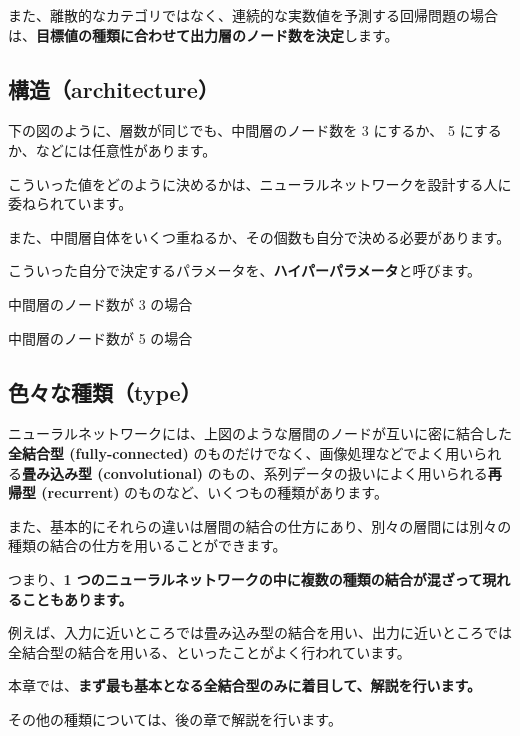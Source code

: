 また、離散的なカテゴリではなく、連続的な実数値を予測する回帰問題の場合は、\textbf{目標値の種類に合わせて出力層のノード数を決定}します。


\subsection{構造（architecture）}


下の図のように、層数が同じでも、中間層のノード数を 3 にするか、 5 にするか、などには任意性があります。

こういった値をどのように決めるかは、ニューラルネットワークを設計する人に委ねられています。

また、中間層自体をいくつ重ねるか、その個数も自分で決める必要があります。

こういった自分で決定するパラメータを、\textbf{ハイパーパラメータ}と呼びます。



中間層のノード数が 3 の場合



中間層のノード数が 5 の場合


\subsection{色々な種類（type）}


ニューラルネットワークには、上図のような層間のノードが互いに密に結合した\textbf{全結合型 (fully-connected)} のものだけでなく、画像処理などでよく用いられる\textbf{畳み込み型 (convolutional)} のもの、系列データの扱いによく用いられる\textbf{再帰型 (recurrent)} のものなど、いくつもの種類があります。

また、基本的にそれらの違いは層間の結合の仕方にあり、別々の層間には別々の種類の結合の仕方を用いることができます。

つまり、\textbf{1 つのニューラルネットワークの中に複数の種類の結合が混ざって現れることもあります。}

例えば、入力に近いところでは畳み込み型の結合を用い、出力に近いところでは全結合型の結合を用いる、といったことがよく行われています。


本章では、\textbf{まず最も基本となる全結合型のみに着目して、解説を行います。}

その他の種類については、後の章で解説を行います。


